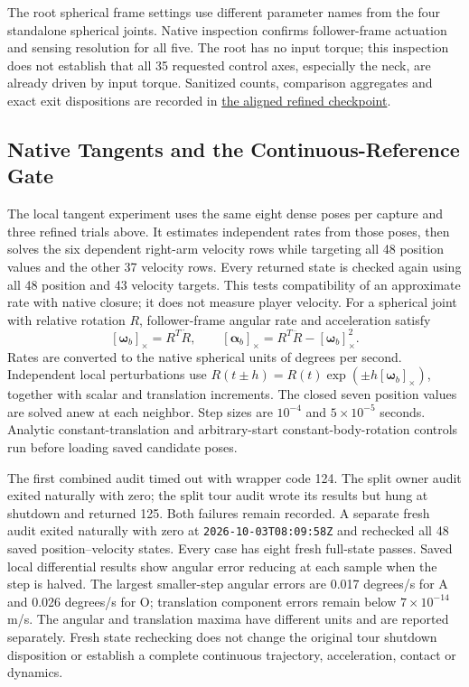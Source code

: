 \documentclass[11pt,a4paper]{article}
\begin{document}
The root spherical frame settings use different parameter names from the
four standalone spherical joints. Native inspection confirms follower-frame
actuation and sensing resolution for all five. The root has no input torque;
this inspection does not establish that all 35 requested control axes,
especially the neck, are already driven by input torque. Sanitized counts,
comparison aggregates and exact exit dispositions are recorded in
\href{aligned_refined_checkpoint_20261003.json}{the aligned refined checkpoint}.


\subsection{Native Tangents and the Continuous-Reference Gate}
\label{sec:refined-tangent-c2}
The local tangent experiment uses the same eight dense poses per capture and
three refined trials above. It estimates independent rates from those poses,
then solves the six dependent right-arm velocity rows while targeting all 48
position values and the other 37 velocity rows. Every returned state is checked
again using all 48 position and 43 velocity targets. This tests compatibility
of an approximate rate with native closure; it does not measure player velocity.
For a spherical joint with relative rotation $R$, follower-frame angular rate
and acceleration satisfy
\[
 [\boldsymbol\omega_b]_\times=R^T\dot R,\qquad
 [\boldsymbol\alpha_b]_\times=
 R^T\ddot R-[\boldsymbol\omega_b]_\times^2.
\]
Rates are converted to the native spherical units of degrees per second.
Independent local perturbations use $R(t\mathbin\pm h)=R(t)
\exp(\mathbin\pm h[\boldsymbol\omega_b]_\times)$, together with scalar and
translation increments. The closed seven position values are solved anew at
each neighbor. Step sizes are $10^{-4}$ and $5\times10^{-5}$ seconds.
Analytic constant-translation and arbitrary-start constant-body-rotation
controls run before loading saved candidate poses.

The first combined audit timed out with wrapper code 124. The split owner
audit exited naturally with zero; the split tour audit wrote its results but
hung at shutdown and returned 125. Both failures remain recorded. A separate
fresh audit exited naturally with zero at \texttt{2026-10-03T08:09:58Z} and
rechecked all 48 saved position--velocity states. Every case has eight fresh
full-state passes. Saved local differential results show angular error reducing
at each sample when the step is halved. The largest smaller-step angular errors
are 0.017 degrees/s for A and 0.026 degrees/s for O; translation component
errors remain below $7\times10^{-14}$ m/s. The angular and translation maxima
have different units and are reported separately. Fresh state rechecking does
not change the original tour shutdown disposition or establish a complete
continuous trajectory, acceleration, contact or dynamics.
\end{document}
